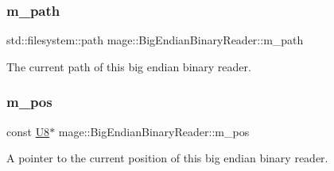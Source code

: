 \subsubsection{\texorpdfstring{m\+\_\+path}{m\_path}}
{\footnotesize\ttfamily std\+::filesystem\+::path mage\+::\+Big\+Endian\+Binary\+Reader\+::m\+\_\+path\hspace{0.3cm}{\ttfamily [private]}}

The current path of this big endian binary reader. \mbox{\label{classmage_1_1_big_endian_binary_reader_a7dbfc5ce1712e431f75d80a4f7a56e33}} 
\subsubsection{\texorpdfstring{m\+\_\+pos}{m\_pos}}
{\footnotesize\ttfamily const \mbox{\hyperlink{namespacemage_afc638980bc6154f15af5e2d93a0e0ea9}{U8}}$\ast$ mage\+::\+Big\+Endian\+Binary\+Reader\+::m\+\_\+pos\hspace{0.3cm}{\ttfamily [private]}}

A pointer to the current position of this big endian binary reader. 